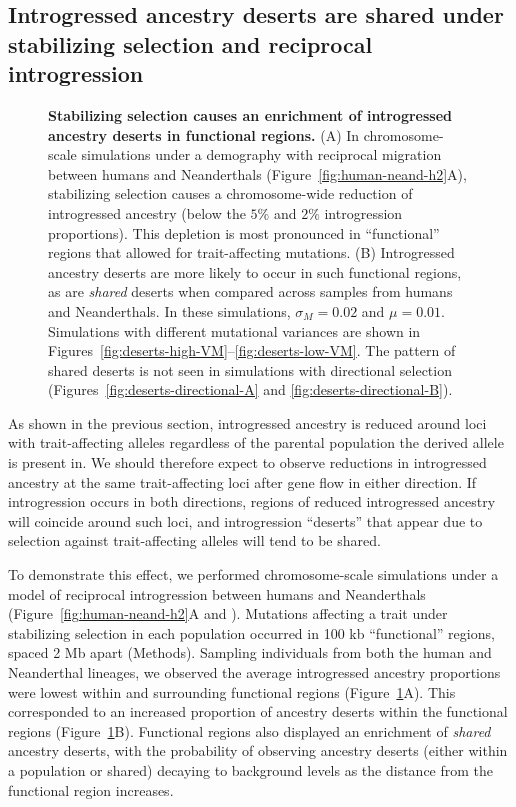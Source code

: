 \documentclass[10pt,letterpaper]{article}
\begin{document}
\subsection*{Introgressed ancestry deserts are shared under stabilizing
selection and reciprocal introgression}

\begin{figure}[ht!]
    \centering
    \caption{
        \textbf{Stabilizing selection causes an enrichment of introgressed
        ancestry deserts in functional regions.} (A) In chromosome-scale
        simulations under a demography with reciprocal migration between humans
        and Neanderthals (Figure~\ref{fig:human-neand-h2}A), stabilizing
        selection causes a chromosome-wide reduction of introgressed ancestry
        (below the $5\%$ and $2\%$ introgression proportions). This depletion
        is most pronounced in ``functional'' regions that allowed for
        trait-affecting mutations. (B) Introgressed ancestry deserts are
        more likely to occur in such functional regions, as are
        \emph{shared} deserts when compared across samples from humans and
        Neanderthals. In these simulations, $\sigma_M=0.02$ and $\mu=0.01$.
        Simulations with different mutational variances are shown in
        Figures~\ref{fig:deserts-high-VM}--\ref{fig:deserts-low-VM}.
        The pattern of shared deserts is not seen in simulations with
        directional selection (Figures~\ref{fig:deserts-directional-A}
        and \ref{fig:deserts-directional-B}).
    }
    \label{fig:deserts}
\end{figure}

As shown in the previous section, introgressed ancestry is reduced around loci
with trait-affecting alleles regardless of the parental population the derived
allele is present in. We should therefore expect to observe reductions in
introgressed ancestry at the same trait-affecting loci after gene flow in
either direction. If introgression occurs in both directions, regions of
reduced introgressed ancestry will coincide around such loci, and introgression
``deserts'' that appear due to selection against trait-affecting alleles will
tend to be shared.

To demonstrate this effect, we performed chromosome-scale simulations under a
model of reciprocal introgression between humans and Neanderthals
(Figure~\ref{fig:human-neand-h2}A and \cite{harris2023diverse}). Mutations
affecting a trait under stabilizing selection in each population occurred in
100 kb ``functional'' regions, spaced 2 Mb apart (Methods). Sampling
individuals from both the human and Neanderthal lineages, we observed the
average introgressed ancestry proportions were lowest within and surrounding
functional regions (Figure~\ref{fig:deserts}A). This corresponded to an
increased proportion of ancestry deserts within the functional regions
(Figure~\ref{fig:deserts}B). Functional regions also displayed an enrichment
of \emph{shared} ancestry deserts, with the probability of observing ancestry
deserts (either within a population or shared) decaying to background levels as
the distance from the functional region increases.
\end{document}
